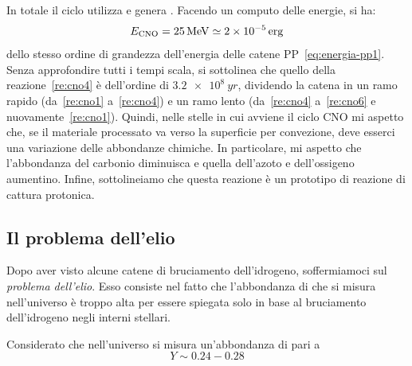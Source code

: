 In totale il ciclo utilizza  e genera . Facendo un computo delle energie, si ha:
\begin{equation}\label{eq:energia-cno}
E_\textup{CNO} = \SI{25}{MeV} \simeq \SI{2e-5}{erg}
\end{equation}
dello stesso ordine di grandezza dell'energia delle catene PP~\eqref{eq:energia-pp1}. Senza approfondire tutti i tempi scala, si sottolinea che quello della reazione~\ref{re:cno4} è dell'ordine di $\SI{3.2e8}{yr}$, dividendo la catena in un ramo rapido (da~\ref{re:cno1} a~\ref{re:cno4}) e un ramo lento (da~\ref{re:cno4} a~\ref{re:cno6} e nuovamente~\ref{re:cno1}). Quindi, nelle stelle in cui avviene il ciclo CNO mi aspetto che, se il materiale processato va verso la superficie per convezione, deve esserci una variazione delle abbondanze chimiche. In particolare, mi aspetto che l'abbondanza del carbonio diminuisca e quella dell'azoto e dell'ossigeno aumentino. Infine, sottolineiamo che questa reazione è un prototipo di reazione di cattura protonica.

\subsection{Il problema dell'elio}
Dopo aver visto alcune catene di bruciamento dell'idrogeno, soffermiamoci sul \emph{problema dell'elio}. Esso consiste nel fatto che l'abbondanza di  che si misura nell'universo è troppo alta per essere spiegata solo in base al bruciamento dell'idrogeno negli interni stellari.

Considerato che nell'universo si misura un'abbondanza di  pari a
\begin{equation}\label{eq:abbondanza-elio-misurata}
    Y \sim 0.24 - 0.28
\end{equation}

